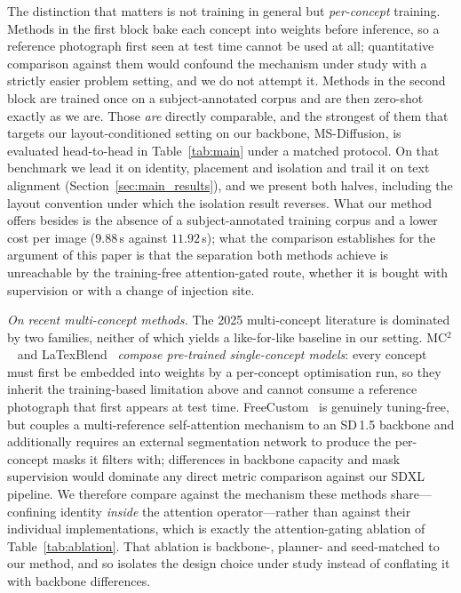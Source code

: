\documentclass[review,10pt,times]{elsarticle}
\begin{document}
\noindent
The distinction that matters is not training in general but \emph{per-concept}
training.  Methods in the first block bake each concept into weights before
inference, so a reference photograph first seen at test time cannot be used at
all; quantitative comparison against them would confound the mechanism under
study with a strictly easier problem setting, and we do not attempt it.
Methods in the second block are trained once on a subject-annotated corpus and
are then zero-shot exactly as we are.  Those \emph{are} directly comparable,
and the strongest of them that targets our layout-conditioned setting on our
backbone, MS-Diffusion, is evaluated head-to-head in Table~\ref{tab:main}
under a matched protocol.  On that benchmark we lead it on identity,
placement and isolation and trail it on text alignment
(Section~\ref{sec:main_results}), and we present both halves, including the
layout convention under which the isolation result reverses.  What our method
offers besides is the absence of a subject-annotated training corpus and a
lower cost per image ($9.88$\,s against $11.92$\,s); what the comparison
establishes for the argument of this paper is that
the separation both methods achieve is unreachable by the training-free
attention-gated route, whether it is bought with supervision or with a change
of injection site.

\noindent\textit{On recent multi-concept methods.}
The 2025 multi-concept literature is dominated by two families, neither
of which yields a like-for-like baseline in our setting.
MC$^2$~\cite{mc2_2025} and LaTexBlend~\cite{latexblend2025} \emph{compose
pre-trained single-concept models}: every concept must first be embedded
into weights by a per-concept optimisation run, so they inherit the
training-based limitation above and cannot consume a reference photograph
that first appears at test time.
FreeCustom~\cite{freecustom2024} is genuinely tuning-free, but couples a
multi-reference self-attention mechanism to an SD\,1.5 backbone and
additionally requires an external segmentation network to produce the
per-concept masks it filters with; differences in backbone capacity and
mask supervision would dominate any direct metric comparison against our
SDXL pipeline.
We therefore compare against the mechanism these methods share---confining
identity \emph{inside} the attention operator---rather than against their
individual implementations, which is exactly the attention-gating ablation
of Table~\ref{tab:ablation}.  That ablation is backbone-, planner- and
seed-matched to our method, and so isolates the design choice under study
instead of conflating it with backbone differences.
\end{document}
